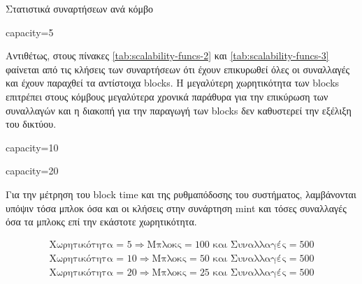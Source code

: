 \documentclass{article}
\newcommand{\eng}[1]{\foreignlanguage{english}{#1}} %
\begin{document}
\begin{table}[ht]
    \caption{Στατιστικά συναρτήσεων ανά κόμβο}
    \label{tab:scalability-funcs}
    \begin{subtable}{\textwidth}
        \centering
        \caption{\eng{capacity=5}}
        \label{tab:scalability-funcs-1}
    \end{subtable}
\end{table}

Αντιθέτως, στους πίνακες \ref{tab:scalability-funcs-2} και \ref{tab:scalability-funcs-3}
φαίνεται από τις κλήσεις των συναρτήσεων ότι έχουν επικυρωθεί όλες οι συναλλαγές
και έχουν παραχθεί τα αντίστοιχα \eng{blocks}. Η μεγαλύτερη χωρητικότητα των
\eng{blocks} επιτρέπει στους κόμβους μεγαλύτερα χρονικά παράθυρα για την
επικύρωση των συναλλαγών και η διακοπή για την παραγωγή των \eng{blocks} δεν
καθυστερεί την εξέλιξη του δικτύου.

\begin{table}[ht]
    \ContinuedFloat
    \begin{subtable}{0.45\textwidth}
        \centering
        \caption{\eng{capacity=10}}
        \label{tab:scalability-funcs-2}
    \end{subtable}
    \hfill
    \begin{subtable}{0.45\textwidth}
        \centering
        \caption{\eng{capacity=20}}
        \label{tab:scalability-funcs-3}
    \end{subtable}
\end{table}
\FloatBarrier

Για την μέτρηση του \eng{block time} και της ρυθμαπόδοσης του συστήματος, λαμβάνονται
υπόψιν τόσα μπλοκ όσα και οι κλήσεις στην συνάρτηση \eng{mint} και τόσες συναλλαγές
όσα τα μπλοκς επί την εκάστοτε χωρητικότητα.

\begin{equation}
    \begin{gathered}
        \text{Χωρητικότητα = 5} \Rightarrow \text{Μπλοκς} = 100 \text{ και } \text{Συναλλαγές} = 500 \\
        \text{Χωρητικότητα = 10} \Rightarrow \text{Μπλοκς} = 50 \text{ και } \text{Συναλλαγές} = 500 \\
        \text{Χωρητικότητα = 20} \Rightarrow \text{Μπλοκς} = 25 \text{ και } \text{Συναλλαγές} = 500 \\
    \end{gathered}
\end{equation}
\end{document}
